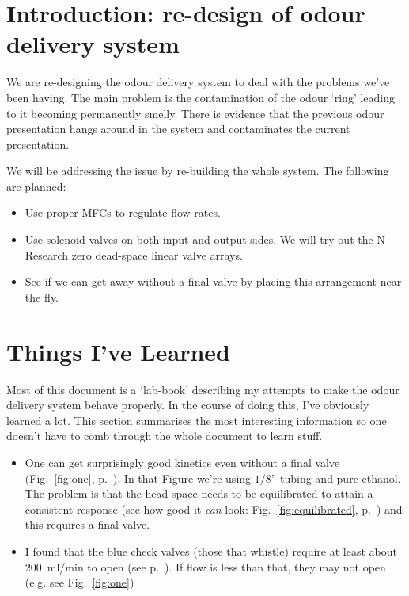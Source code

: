 \documentclass[a4paper]{report}
\begin{document}
\section{Introduction: re-design of odour delivery system}
We are re-designing the odour delivery system to deal with the
problems we've been having. The main problem is the contamination of
the odour `ring' leading to it becoming permanently smelly. There is
evidence that the previous odour presentation hangs around in the
system and contaminates the current presentation. 

We will be addressing the issue by re-building the whole system. The
following are planned:
\begin{itemize}
\item Use proper MFCs to regulate flow rates.
\item Use solenoid valves on both input and output sides. We will try
  out the N-Research zero dead-space linear valve arrays. 
\item See if we can get away without a final valve by placing this
  arrangement near the fly. 
\end{itemize}

\section{Things I've Learned}
Most of this document is a `lab-book' describing my attempts to make
the odour delivery system behave properly. In the course of doing
this, I've obviously learned a lot. This section summarises the most
interesting information so one doesn't have to comb through the whole
document to learn stuff. 

\begin{itemize}
\item One can get surprisingly good kinetics even without a final
  valve (Fig.~\ref{fig:one}, p.~\pageref{fig:one}). In that Figure
  we're using $1/8$'' tubing and pure ethanol. The problem is that the
  head-space needs to be equilibrated to attain a consistent response
  (see how good it \textit{can} look: Fig.~\ref{fig:equilibrated},
  p.~\pageref{fig:equilibrated}) and this requires a final valve.
\item I found that the blue check valves (those that whistle) require
  at least about 200~ml/min to open (see
  p.~\pageref{stickingValves}). If flow is less than that, they may not
  open (e.g. see Fig.~\ref{fig:one})

\end{itemize}
\end{document}
